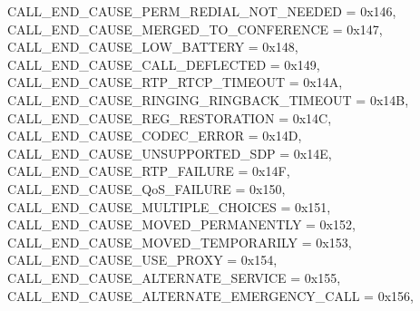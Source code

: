 \begin{DoxyItemize}
 C\+A\+L\+L\+\_\+\+E\+N\+D\+\_\+\+C\+A\+U\+S\+E\+\_\+\+P\+E\+R\+M\+\_\+\+R\+E\+D\+I\+A\+L\+\_\+\+N\+O\+T\+\_\+\+N\+E\+E\+D\+ED = 0x146,~\newline
 C\+A\+L\+L\+\_\+\+E\+N\+D\+\_\+\+C\+A\+U\+S\+E\+\_\+\+M\+E\+R\+G\+E\+D\+\_\+\+T\+O\+\_\+\+C\+O\+N\+F\+E\+R\+E\+N\+CE = 0x147,~\newline
 C\+A\+L\+L\+\_\+\+E\+N\+D\+\_\+\+C\+A\+U\+S\+E\+\_\+\+L\+O\+W\+\_\+\+B\+A\+T\+T\+E\+RY = 0x148,~\newline
 C\+A\+L\+L\+\_\+\+E\+N\+D\+\_\+\+C\+A\+U\+S\+E\+\_\+\+C\+A\+L\+L\+\_\+\+D\+E\+F\+L\+E\+C\+T\+ED = 0x149,~\newline
 C\+A\+L\+L\+\_\+\+E\+N\+D\+\_\+\+C\+A\+U\+S\+E\+\_\+\+R\+T\+P\+\_\+\+R\+T\+C\+P\+\_\+\+T\+I\+M\+E\+O\+UT = 0x14A,~\newline
 C\+A\+L\+L\+\_\+\+E\+N\+D\+\_\+\+C\+A\+U\+S\+E\+\_\+\+R\+I\+N\+G\+I\+N\+G\+\_\+\+R\+I\+N\+G\+B\+A\+C\+K\+\_\+\+T\+I\+M\+E\+O\+UT = 0x14B,~\newline
 C\+A\+L\+L\+\_\+\+E\+N\+D\+\_\+\+C\+A\+U\+S\+E\+\_\+\+R\+E\+G\+\_\+\+R\+E\+S\+T\+O\+R\+A\+T\+I\+ON = 0x14C,~\newline
 C\+A\+L\+L\+\_\+\+E\+N\+D\+\_\+\+C\+A\+U\+S\+E\+\_\+\+C\+O\+D\+E\+C\+\_\+\+E\+R\+R\+OR = 0x14D,~\newline
 C\+A\+L\+L\+\_\+\+E\+N\+D\+\_\+\+C\+A\+U\+S\+E\+\_\+\+U\+N\+S\+U\+P\+P\+O\+R\+T\+E\+D\+\_\+\+S\+DP = 0x14E,~\newline
 C\+A\+L\+L\+\_\+\+E\+N\+D\+\_\+\+C\+A\+U\+S\+E\+\_\+\+R\+T\+P\+\_\+\+F\+A\+I\+L\+U\+RE = 0x14F,~\newline
 C\+A\+L\+L\+\_\+\+E\+N\+D\+\_\+\+C\+A\+U\+S\+E\+\_\+\+Qo\+S\+\_\+\+F\+A\+I\+L\+U\+RE = 0x150,~\newline
 C\+A\+L\+L\+\_\+\+E\+N\+D\+\_\+\+C\+A\+U\+S\+E\+\_\+\+M\+U\+L\+T\+I\+P\+L\+E\+\_\+\+C\+H\+O\+I\+C\+ES = 0x151,~\newline
 C\+A\+L\+L\+\_\+\+E\+N\+D\+\_\+\+C\+A\+U\+S\+E\+\_\+\+M\+O\+V\+E\+D\+\_\+\+P\+E\+R\+M\+A\+N\+E\+N\+T\+LY = 0x152,~\newline
 C\+A\+L\+L\+\_\+\+E\+N\+D\+\_\+\+C\+A\+U\+S\+E\+\_\+\+M\+O\+V\+E\+D\+\_\+\+T\+E\+M\+P\+O\+R\+A\+R\+I\+LY = 0x153,~\newline
 C\+A\+L\+L\+\_\+\+E\+N\+D\+\_\+\+C\+A\+U\+S\+E\+\_\+\+U\+S\+E\+\_\+\+P\+R\+O\+XY = 0x154,~\newline
 C\+A\+L\+L\+\_\+\+E\+N\+D\+\_\+\+C\+A\+U\+S\+E\+\_\+\+A\+L\+T\+E\+R\+N\+A\+T\+E\+\_\+\+S\+E\+R\+V\+I\+CE = 0x155,~\newline
 C\+A\+L\+L\+\_\+\+E\+N\+D\+\_\+\+C\+A\+U\+S\+E\+\_\+\+A\+L\+T\+E\+R\+N\+A\+T\+E\+\_\+\+E\+M\+E\+R\+G\+E\+N\+C\+Y\+\_\+\+C\+A\+LL = 0x156,~\newline

\end{DoxyItemize}
